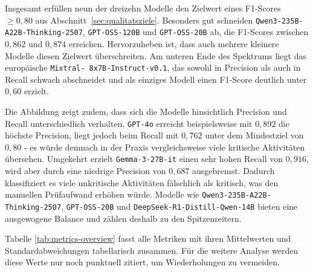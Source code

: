 Insgesamt erfüllen neun der dreizehn Modelle den Zielwert eines F1-Scores $\geq 0{,}80$ aus Abschnitt~\ref{sec:qualitatsziele}. Besonders gut schneiden \texttt{Qwen3-235B-A22B-Thinking-2507}, \texttt{GPT-OSS-120B} und \texttt{GPT-OSS-20B} ab, die F1-Scores zwischen $0{,}862$ und $0{,}874$ erreichen. Hervorzuheben ist, dass auch mehrere kleinere Modelle diesen Zielwert überschreiten. Am unteren Ende des Spektrums liegt das europäische \texttt{Mixtral-\linebreak~8x7B-Instruct-v0.1}, das sowohl in Precision als auch in Recall schwach abschneidet und als einziges Modell einen F1-Score deutlich unter $0{,}60$ erzielt.

Die Abbildung zeigt zudem, dass sich die Modelle hinsichtlich Precision und Recall unterschiedlich verhalten. \texttt{GPT-4o} erreicht beispielsweise mit $0{,}892$ die höchste Precision, liegt jedoch beim Recall mit $0{,}762$ unter dem Mindestziel von $0{,}80$ - es würde demnach in der Praxis vergleichsweise viele kritische Aktivitäten übersehen. Umgekehrt erzielt \texttt{Gemma-3-27B-it} einen sehr hohen Recall von $0{,}916$, wird aber durch eine niedrige Precision von $0{,}687$ ausgebremst. Dadurch klassifiziert es viele unkritische Aktivitäten fälschlich als kritisch, was den manuellen Prüfaufwand erhöhen würde. Modelle wie \texttt{Qwen3-235B-A22B-Thinking-2507}, \texttt{GPT-OSS-20B} und \texttt{DeepSeek-R1-Distill-Qwen-14B} bieten eine ausgewogene Balance und zählen deshalb zu den Spitzenreitern.

Tabelle \ref{tab:metrics-overview} fasst alle Metriken mit ihren Mittelwerten und Standardabweichungen tabellarisch zusammen. Für die weitere Analyse werden diese Werte nur noch punktuell zitiert, um Wiederholungen zu vermeiden.

